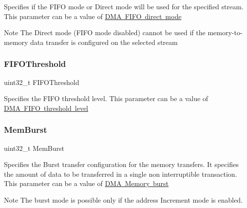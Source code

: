Specifies if the F\+I\+FO mode or Direct mode will be used for the specified stream. This parameter can be a value of \mbox{\hyperlink{group___d_m_a___f_i_f_o__direct__mode}{D\+MA F\+I\+FO direct mode}} \begin{DoxyNote}{Note}
The Direct mode (F\+I\+FO mode disabled) cannot be used if the memory-\/to-\/memory data transfer is configured on the selected stream 
\end{DoxyNote}
\mbox{\label{struct_d_m_a___init_type_def_a28732ef5d9eae23dbd77e3034cc1bdb3}} 
\subsubsection{\texorpdfstring{F\+I\+F\+O\+Threshold}{FIFOThreshold}}
{\footnotesize\ttfamily uint32\+\_\+t F\+I\+F\+O\+Threshold}

Specifies the F\+I\+FO threshold level. This parameter can be a value of \mbox{\hyperlink{group___d_m_a___f_i_f_o__threshold__level}{D\+MA F\+I\+FO threshold level}} \mbox{\label{struct_d_m_a___init_type_def_a4e6e9f06e5c7903879ed29df299e4df1}} 
\subsubsection{\texorpdfstring{Mem\+Burst}{MemBurst}}
{\footnotesize\ttfamily uint32\+\_\+t Mem\+Burst}

Specifies the Burst transfer configuration for the memory transfers. It specifies the amount of data to be transferred in a single non interruptible transaction. This parameter can be a value of \mbox{\hyperlink{group___d_m_a___memory__burst}{D\+MA Memory burst}} \begin{DoxyNote}{Note}
The burst mode is possible only if the address Increment mode is enabled. 
\end{DoxyNote}
\mbox{\label{struct_d_m_a___init_type_def_afe3adac32f5411b1a744c030f398aa5e}} 
